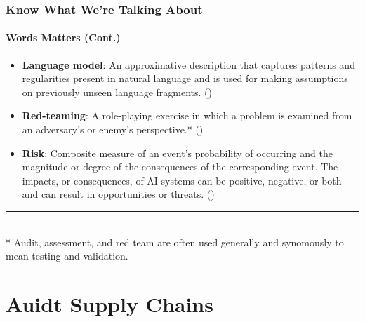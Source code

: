 \documentclass[11pt,
               aspectratio=169,
               hyperref={colorlinks}
               ]{beamer}
\begin{document}
		\begin{frame}
			
			\frametitle{Know What We're Talking About}
			\framesubtitle{Words Matters (Cont.)}
			
			\begin{itemize}
				
				\item \textbf{Language model}: An approximative description that captures patterns and regularities present in natural language and is used for making assumptions on previously unseen language fragments. (\cite{atherton2023language})

				\item \textbf{Red-teaming}: A role-playing exercise in which a problem is examined from an adversary’s or enemy’s perspective.* (\cite{atherton2023language})

				
				\item \textbf{Risk}: Composite measure of an event’s probability of occurring and the magnitude or degree of the consequences of the corresponding event. The impacts, or consequences, of AI systems can be positive, negative, or both and can result in opportunities or threats. (\cite{atherton2023language})

			\end{itemize}
			
			\vspace{10pt}
			\par\noindent\rule{100pt}{0.4pt}\\
			\vspace{5pt}
			\scriptsize{* Audit, assessment, and red team are often used generally and synomously to mean testing and validation.}
		
		\end{frame}




	\section{Auidt Supply Chains}
\end{document}

